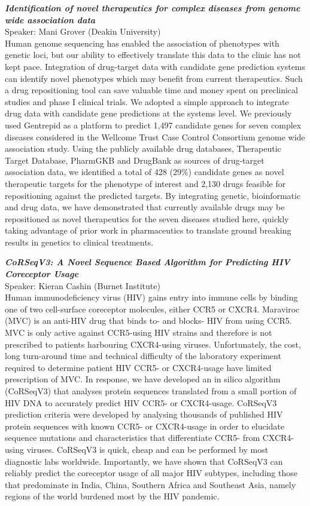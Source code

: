 \documentclass[10pt,]{article}
\begin{document}
\begin{minipage}[c]{\linewidth}
\emph{\bfseries Identification of novel therapeutics for complex diseases from genome wide association data}\\
Speaker: Mani Grover (Deakin University)\\[1ex]
{ \small
Human genome sequencing has enabled the association of
phenotypes with genetic loci, but our ability to effectively translate this
data to the clinic has not kept pace. Integration of drug-target data with
candidate gene prediction systems can identify novel phenotypes which may
benefit from current therapeutics. Such a drug repositioning tool can save
valuable time and money spent on preclinical studies and phase I clinical
trials. We adopted a simple approach to integrate drug data with candidate
gene predictions at the systems level. We previously used Gentrepid as a
platform to predict 1,497 candidate genes for seven complex diseases considered
in the Wellcome Trust Case Control Consortium genome wide association study.
Using the publicly available drug databases, Therapeutic Target Database,
PharmGKB and DrugBank as sources of drug-target association data, we identified
a total of 428 (29\%) candidate genes as novel therapeutic targets for the
phenotype of interest and 2,130 drugs feasible for repositioning against the
predicted targets.  By integrating genetic, bioinformatic and drug data, we
have demonstrated that currently available drugs may be repositioned as novel
therapeutics for the seven diseases studied here, quickly taking advantage of
prior work in pharmaceutics to translate ground breaking results in genetics to
clinical treatments.}

\vspace{3ex}

\emph{\bfseries CoRSeqV3: A Novel Sequence Based Algorithm for Predicting HIV Coreceptor Usage}\\
Speaker: Kieran Cashin (Burnet Institute)\\[1ex]
{\small
Human immunodeficiency virus (HIV) gains entry into immune cells by binding one
of two cell-surface coreceptor molecules, either CCR5 or CXCR4. Maraviroc (MVC)
is an anti-HIV drug that binds to- and blocks- HIV from using CCR5. MVC is only
active against CCR5-using HIV strains and therefore is not prescribed to
patients harbouring CXCR4-using viruses. Unfortunately, the cost, long
turn-around time and technical difficulty of the laboratory experiment required
to determine patient HIV CCR5- or CXCR4-usage have limited prescription of MVC.
In response, we have developed an in silico algorithm (CoRSeqV3) that analyses
protein sequences translated from a small portion of HIV DNA to accurately
predict HIV CCR5- or CXCR4-usage. CoRSeqV3 prediction criteria were developed
by analysing thousands of published HIV protein sequences with known CCR5- or
CXCR4-usage in order to elucidate sequence mutations and characteristics that
differentiate CCR5- from CXCR4-using viruses. CoRSeqV3 is quick, cheap and can
be performed by most diagnostic labs worldwide. Importantly, we have shown that
CoRSeqV3 can reliably predict the coreceptor usage of all major HIV subtypes,
including those that predominate in India, China, Southern Africa and Southeast
Asia, namely regions of the world burdened most by the HIV pandemic.}

\end{minipage}

\vfill
\end{document}
